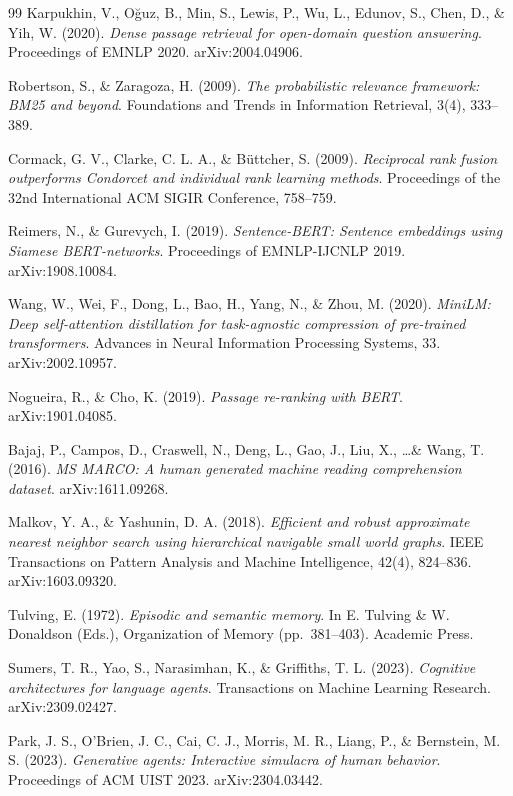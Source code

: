 \begin{thebibliography}{99}
Karpukhin, V., O\u{g}uz, B., Min, S., Lewis, P., Wu, L., Edunov, S., Chen, D., \& Yih, W. (2020).
\textit{Dense passage retrieval for open-domain question answering}.
Proceedings of EMNLP 2020. arXiv:2004.04906.

Robertson, S., \& Zaragoza, H. (2009).
\textit{The probabilistic relevance framework: BM25 and beyond}.
Foundations and Trends in Information Retrieval, 3(4), 333--389.

Cormack, G. V., Clarke, C. L. A., \& B\"{u}ttcher, S. (2009).
\textit{Reciprocal rank fusion outperforms Condorcet and individual rank learning methods}.
Proceedings of the 32nd International ACM SIGIR Conference, 758--759.

Reimers, N., \& Gurevych, I. (2019).
\textit{Sentence-BERT: Sentence embeddings using Siamese BERT-networks}.
Proceedings of EMNLP-IJCNLP 2019. arXiv:1908.10084.

Wang, W., Wei, F., Dong, L., Bao, H., Yang, N., \& Zhou, M. (2020).
\textit{MiniLM: Deep self-attention distillation for task-agnostic compression of pre-trained transformers}.
Advances in Neural Information Processing Systems, 33. arXiv:2002.10957.

Nogueira, R., \& Cho, K. (2019).
\textit{Passage re-ranking with BERT}.
arXiv:1901.04085.

Bajaj, P., Campos, D., Craswell, N., Deng, L., Gao, J., Liu, X., \ldots \& Wang, T. (2016).
\textit{MS MARCO: A human generated machine reading comprehension dataset}.
arXiv:1611.09268.

Malkov, Y. A., \& Yashunin, D. A. (2018).
\textit{Efficient and robust approximate nearest neighbor search using hierarchical navigable small world graphs}.
IEEE Transactions on Pattern Analysis and Machine Intelligence, 42(4), 824--836. arXiv:1603.09320.

Tulving, E. (1972).
\textit{Episodic and semantic memory}.
In E. Tulving \& W. Donaldson (Eds.), Organization of Memory (pp.\ 381--403). Academic Press.

Sumers, T. R., Yao, S., Narasimhan, K., \& Griffiths, T. L. (2023).
\textit{Cognitive architectures for language agents}.
Transactions on Machine Learning Research. arXiv:2309.02427.

Park, J. S., O'Brien, J. C., Cai, C. J., Morris, M. R., Liang, P., \& Bernstein, M. S. (2023).
\textit{Generative agents: Interactive simulacra of human behavior}.
Proceedings of ACM UIST 2023. arXiv:2304.03442.


\end{thebibliography}
